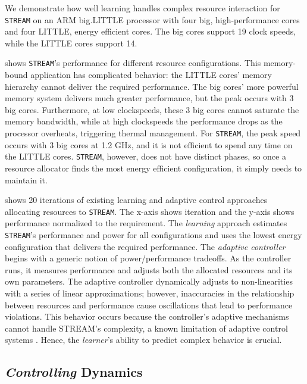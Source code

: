 We demonstrate how well learning handles complex resource interaction
for \texttt{STREAM} on an ARM big.LITTLE processor with four big,
high-performance cores and four LITTLE, energy efficient cores.  The
big cores support 19 clock speeds, while the LITTLE cores support 14.


 shows \texttt{STREAM}'s performance for
different resource configurations.  This memory-bound application has
complicated behavior: the LITTLE cores' memory hierarchy cannot
deliver the required performance.  The big cores' more powerful memory
system delivers much greater performance, but the peak occurs with 3
big cores.  Furthermore, at low clockspeeds, these 3 big cores cannot
saturate the memory bandwidth, while at high clockspeeds the
performance drops as the processor overheats, triggering thermal
management.  For \texttt{STREAM}, the peak speed occurs with 3 big
cores at 1.2 GHz, and it is not efficient to spend any time on the
LITTLE cores.  \texttt{STREAM}, however, does not have distinct
phases, so once a resource allocator finds the most energy efficient
configuration, it simply needs to maintain it.


 shows 20 iterations of existing learning
\cite{LEO} and adaptive control \cite{POET} approaches allocating
resources to \texttt{STREAM}.  The x-axis shows iteration and the
y-axis shows performance normalized to the requirement.  The
\emph{learning} approach estimates \texttt{STREAM}'s performance and
power for all configurations and uses the lowest energy configuration
that delivers the required performance.  The \emph{adaptive
  controller} begins with a generic notion of power/performance
tradeoffs.  As the controller runs, it measures performance and
adjusts both the allocated resources and its own parameters.  The
adaptive controller dynamically adjusts to non-linearities with a
series of linear approximations; however, inaccuracies in the
relationship between resources and performance cause oscillations that
lead to performance violations.  This behavior occurs because the
controller's adaptive mechanisms cannot handle STREAM's complexity, a
known limitation of adaptive control systems
\cite{ControlWare,POET,ICSE2014}.  Hence, the \emph{learner}'s ability
to predict complex behavior is crucial.

\subsection{\emph{Controlling} Dynamics}

